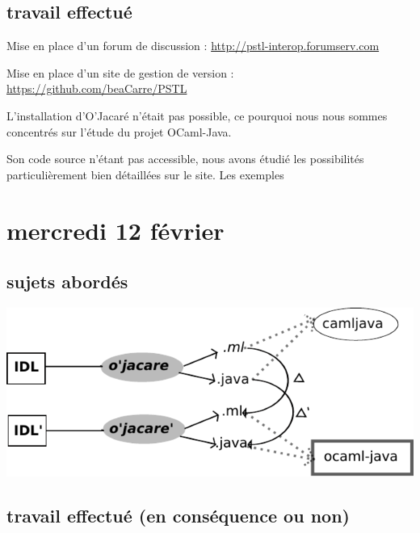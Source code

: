 \documentclass[a4paper, 11pt]{report}
\begin{document}
\subsection{travail effectué}
Mise en place d'un forum de discussion :
\url{http://pstl-interop.forumserv.com}

Mise en place d'un site de gestion de version :
\url{https://github.com/beaCarre/PSTL}
\newline

L'installation d'O'Jacaré n'était pas possible, ce pourquoi nous nous sommes concentrés sur l'étude du projet OCaml-Java. 

Son code source n'étant pas accessible, nous avons étudié les possibilités particulièrement bien détaillées sur le site. Les exemples 










\section{mercredi 12 février}
\subsection{sujets abordés}


\includegraphics{schema1.pdf}

\subsection{travail effectué (en conséquence ou non)}
\end{document}
